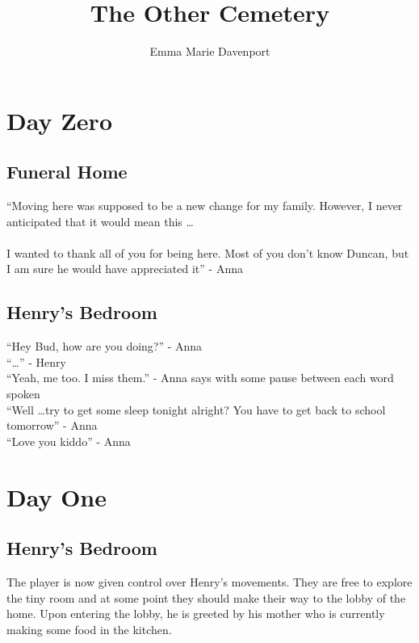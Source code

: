 \documentclass[12pt, a4paper, titlepage]{article}
\author{Emma Marie Davenport}
\title{The Other Cemetery}
\begin{document}
    \maketitle
    
    \section{Day Zero}

        \subsection{Funeral Home}

            ``Moving here was supposed to be a new change for my family. 
            However, I never anticipated that it would mean this \ldots\\~\\
	    I wanted to thank all of you for being here. Most of you
            don't know Duncan, but I am sure he would have appreciated it'' - Anna

        \subsection{Henry's Bedroom}

            ``Hey Bud, how are you doing?'' - Anna\\
            ``\ldots'' - Henry\\
            ``Yeah, me too. I miss them.'' - Anna says with some pause between each word spoken\\
            ``Well \ldots try to get some sleep tonight alright? You have to get back to school tomorrow'' - Anna\\
            ``Love you kiddo'' - Anna\\
            
	\section{Day One}

        \subsection{Henry's Bedroom}

            The player is now given control over Henry's movements. They are free to explore the tiny room and at some point
            they should make their way to the lobby of the home. Upon entering the lobby, he is greeted by his mother who is
            currently making some food in the kitchen.
\end{document}
